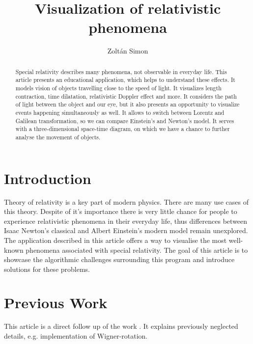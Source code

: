 \documentclass{egpubl}
\title{Visualization of relativistic phenomena}
\author{Zoltán Simon
}
\begin{document}
\maketitle

\begin{abstract}
Special relativity describes many phenomena, not observable in everyday life. This article presents an educational application, which helps to understand these effects. It models vision of objects travelling close to the speed of light. It visualizes length contraction, time dilatation, relativistic Doppler effect and more. It considers the path of light between the object and our eye, but it also presents an opportunity to visualize events happening simultaneously as well. It allows to switch between Lorentz and Galilean transformation, so we can compare Einstein's and Newton's model. It serves with a three-dimensional space-time diagram, on which we have a chance to further analyse the movement of objects.
\begin{classification} %
\end{classification}

\end{abstract}

\section{Introduction}
Theory of relativity is a key part of modern physics. There are many use cases of this theory. Despite of it's importance there is very little chance for people to experience relativistic phenomena in their everyday life, thus differences between Isaac Newton's classical and Albert Einstein's modern model remain unexplored. The application described in this article offers a way to visualise the most well-known phenomena associated with special relativity. The goal of this article is to showcase the algorithmic challenges surrounding this program and introduce solutions for these problems.


\section{Previous Work}

This article is a direct follow up of the work \cite{TDKreport}. It explains previously neglected details, e.g. implementation of Wigner-rotation. 
\end{document}
